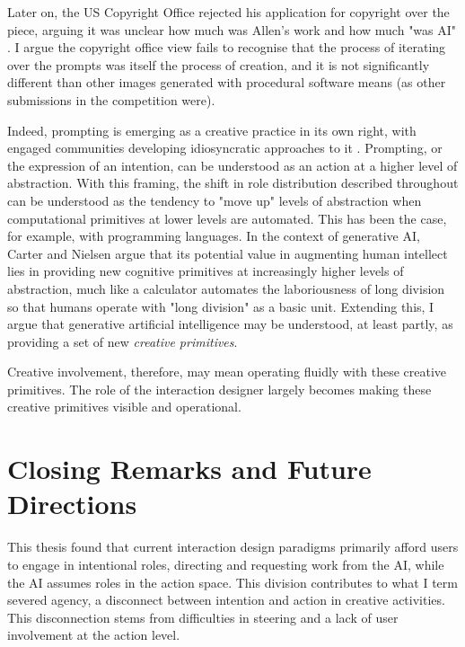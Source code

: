 Later on, the US Copyright Office rejected his application for copyright over the piece, arguing it was unclear how much was Allen's work and how much "was AI" \cite{US-Copyright-Office-Review-Board2023-nw}. I argue the copyright office view fails to recognise that the process of iterating over the prompts was itself the process of creation, and it is not significantly different than other images generated with procedural software means (as other submissions in the competition were). 

Indeed, prompting is emerging as a creative practice in its own right, with engaged communities developing idiosyncratic approaches to it \cite{Chang2023-tv, Smith2022-dm}. Prompting, or the expression of an intention, can be understood as an action at a higher level of abstraction. With this framing, the shift in role distribution described throughout can be understood as the tendency to "move up" levels of abstraction when computational primitives at lower levels are automated. This has been the case, for example, with programming languages. In the context of generative AI, Carter and Nielsen \cite{Carter2017-xj} argue that its potential value in augmenting human intellect lies in providing new cognitive primitives at increasingly higher levels of abstraction, much like a calculator automates the laboriousness of long division so that humans operate with "long division" as a basic unit. Extending this, I argue that generative artificial intelligence may be understood, at least partly, as providing a set of new \textit{creative primitives}.

Creative involvement, therefore, may mean operating fluidly with these creative primitives. The role of the interaction designer largely becomes making these creative primitives visible and operational. 

\section{Closing Remarks and Future Directions}

This thesis found that current interaction design paradigms primarily afford users to engage in intentional roles, directing and requesting work from the AI, while the AI assumes roles in the action space. This division contributes to what I term severed agency, a disconnect between intention and action in creative activities. This disconnection stems from difficulties in steering and a lack of user involvement at the action level.

